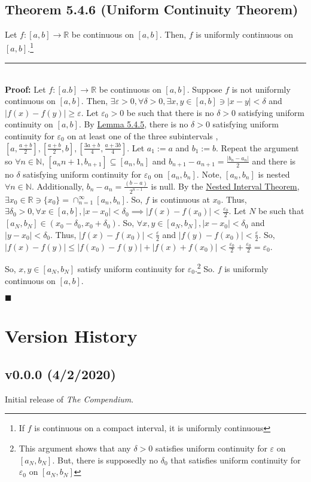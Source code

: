 \documentclass[11pt]{book}
\newcommand{\R}{\mathbb{R}}
\newcommand{\N}{\mathbb{N}}
\newcommand{\horline}{\noindent\rule{14.25cm}{0.6pt}\\}
\newcommand{\QED}{\begin{flushright}$\blacksquare$\end{flushright}}
\begin{document}
		\subsection{Theorem 5.4.6 (Uniform Continuity Theorem)}
		\label{subsec:theor546}
			\begin{theor}
				Let $f:[a,b] \to \R$ be continuous on $[a,b]$. Then, $f$ is uniformly continuous on $[a,b]$.\footnote{If $f$ is continuous on a compact interval, it is uniformly continuous}\hfill\break
				\horline
				\textbf{Proof:} Let $f:[a.b] \to \R$ be continuous on $[a,b]$. Suppose $f$ is not uniformly continuous on $[a,b]$. Then, 
				$\exists \varepsilon > 0, \forall \delta > 0, \exists x,y \in [a,b] \ni |x-y| < \delta$ and $|f(x) - f(y)| \geq \varepsilon$. 
				Let $\varepsilon_0 > 0$ be such that there is no $\delta > 0$ satisfying uniform continuity on $[a,b]$. By \hyperref[subsec:lemm545]{Lemma 5.4.5}, there is no $\delta > 0$ satisfying uniform continuity for $\varepsilon_0$ on at least one of the three subintervals ,$[a,\frac{a+b}{2}], [\frac{a+b}{2}, b],
				[\frac{3a+b}{4}, \frac{a+3b}{4}]$. Let $a_1 := a$ and $b_1:=b$. Repeat the argument so $\forall n \in \N$, $[a_n{n+1}, b_{n+1}] \subseteq
				[a_n,b_n]$ and $b_{n+1} - a_{n+1} = \frac{|b_n - a_n|}{2}$ and there is no $\delta$ satisfying uniform continuity for $\varepsilon_0$
				on $[a_n,b_n]$. Note, $[a_n,b_n]$ is nested $\forall n \in \N$. Additionally, $b_n - a_n = \frac{(b - a)}{2^{n-1}}$ is null. By the
				\hyperref[subsec:theor332]{Nested Interval Theorem}, $\exists x_0 \in \R \ni \{x_0\} = \cap_{n = 1}^{\infty}{[a_n,b_n]}$. So, $f$ is 
				continuous at $x_0$. Thus, $\exists \delta_0 > 0, \forall x \in [a,b], |x-x_0| < \delta_0 \implies |f(x) - f(x_0)| < \frac{\varepsilon_0}{2}$.
				Let $N$ be such that $[a_N,b_N] \in (x_0-\delta_0,x_0+\delta_0)$. So, $\forall x,y \in [a_N,b_N], |x - x_0| < \delta_0$ and 
				$|y-x_0| < \delta_0$. Thus, $|f(x) - f(x_0)| < \frac{\varepsilon}{2}$ and $|f(y) - f(x_0)| < \frac{\varepsilon}{2}$. So, 
				$|f(x) - f(y)| \leq |f(x_0) - f(y)| + |f(x) + f(x_0)| < \frac{\varepsilon_0}{2} + \frac{\varepsilon_0}{2} = \varepsilon_0$.

				So, $x,y \in [a_N,b_N]$ satisfy uniform continuity for $\varepsilon_0$.\footnote{This argument shows that any $\delta>0$ satisfies uniform
				continuity for $\varepsilon$ on $[a_N, b_N]$. But, there is supposedly no $\delta_0$ that satisfies uniform continuity for $\varepsilon_0$
				on $[a_N, b_N]$} So. $f$ is uniformly continuous on $[a,b]$.\QED 
			\end{theor}


\newpage
\section{Version History}
	\subsection{v0.0.0 (4/2/2020)}
		Initial release of \emph{The Compendium}.
		
\end{document}
